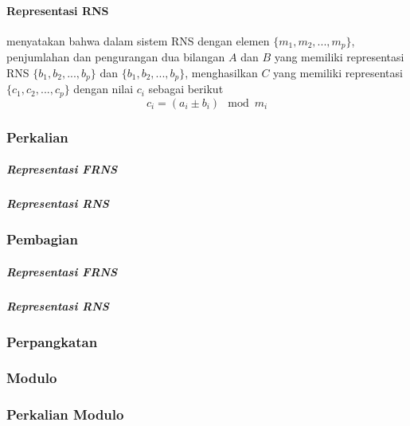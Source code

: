 
\paragraph{Representasi RNS}

\citet{rns_sharoun} menyatakan bahwa dalam sistem RNS dengan elemen $\{m_1,m_2,...,m_p\}$, penjumlahan dan pengurangan dua bilangan $A$ dan $B$ yang memiliki representasi RNS $\{b_1,b_2,...,b_p\}$ dan $\{b_1,b_2,...,b_p\}$,  menghasilkan $C$ yang memiliki representasi $\{c_1,c_2,...,c_p\}$ dengan nilai $c_i$ sebagai berikut
\begin{equation}
    c_i = (a_i \pm b_i) \mod m_i
\end{equation}


\subsubsection{Perkalian}

\subparagraph{Representasi FRNS}

\subparagraph{Representasi RNS}

\subsubsection{Pembagian}

\subparagraph{Representasi FRNS}

\subparagraph{Representasi RNS}

\subsubsection{Perpangkatan}
\subsubsection{Modulo}
\subsubsection{Perkalian Modulo} \label{mod_mul_theory}
